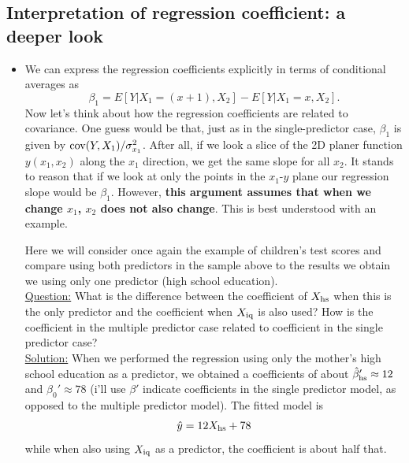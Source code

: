 \subsection{Interpretation of regression coefficient: a deeper look}
\begin{itemize}

\item   We can express the regression coefficients explicitly in terms of conditional averages as
 \begin{equation}\label{eq:beta1exp}
 \beta_1 = E[Y|X_1 = (x+1),X_2] -  E[Y|X_1 = x,X_2].
 \end{equation}
Now let's think about how the regression coefficients are related to covariance. One guess would be that, just as in the single-predictor case, $\beta_1$ is given by ${\rm cov}(Y,X_1)/\sigma_{x_1}^2$. After all, if we look a slice of the 2D planer function $y(x_1,x_2)$ along the $x_1$ direction, we get the same slope for all $x_2$.  It stands to reason that if we look at only the points in the $x_1$-$y$ plane our regression slope would be $\beta_1$. However, {\bf this argument assumes that when we change $x_1$, $x_2$ does not also change}. This is best understood with an example. 


\begin{example}
Here we will consider once again the example of children's test scores and compare using both predictors in the sample above to the results we obtain we using only one predictor (high school education). \\



\noindent
\underline{Question:} What is the difference between the coefficient of $X_{\rm hs}$ when this is the only predictor and the coefficient when $X_{\rm iq}$ is also used? How is the coefficient in the multiple predictor case related to coefficient in the single predictor case?  \\

\noindent
\underline{Solution:} When we performed the regression using only the mother's high school education as a predictor, we obtained a coefficients of about $\hat{\beta}_{\rm hs}' \approx 12$ and $\hat{\beta}_0' \approx 78$ (i'll use $\beta'$ indicate coefficients in the single predictor model, as opposed to the multiple predictor model). The fitted model is
\begin{equation*}
\hat{y} = 12X_{\rm hs} + 78 
\end{equation*}
while when also using $X_{\rm iq}$ as a predictor,  the coefficient is about half that.



\end{example}
\end{itemize}
